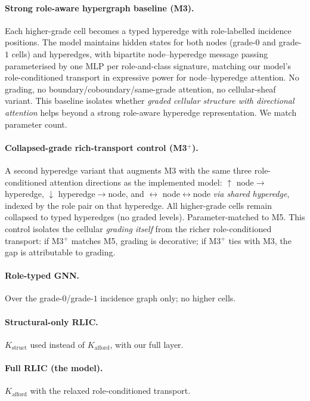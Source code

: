 \documentclass[11pt]{article}
\theoremstyle{definition}
\theoremstyle{plain}
\newcommand{\Kstruct}{K_{\mathrm{struct}}}
\newcommand{\Kafford}{K_{\mathrm{afford}}}
\begin{document}
\paragraph{Strong role-aware hypergraph baseline (M3).}
Each higher-grade cell becomes a typed hyperedge with role-labelled incidence positions. The model maintains hidden states for both nodes (grade-$0$ and grade-$1$ cells) and hyperedges, with bipartite node--hyperedge message passing parameterised by one MLP per role-and-class signature, matching our model's role-conditioned transport in expressive power for node--hyperedge attention. No grading, no boundary/coboundary/same-grade attention, no cellular-sheaf variant. This baseline isolates whether \emph{graded cellular structure with directional attention} helps beyond a strong role-aware hyperedge representation. We match parameter count.

\paragraph{Collapsed-grade rich-transport control (M3$^{+}$).}
A second hyperedge variant that augments M3 with the same three
role-conditioned attention directions as the implemented model: $\uparrow$
node$\to$hyperedge, $\downarrow$ hyperedge$\to$node, and $\leftrightarrow$
node$\leftrightarrow$node \emph{via shared hyperedge}, indexed by the role
pair on that hyperedge. All higher-grade cells remain collapsed to typed
hyperedges (no graded levels). Parameter-matched to M5. This control
isolates the cellular \emph{grading itself} from the richer
role-conditioned transport: if M3$^{+}$ matches M5, grading is decorative;
if M3$^{+}$ ties with M3, the gap is attributable to grading.

\paragraph{Role-typed GNN.}
Over the grade-$0$/grade-$1$ incidence graph only; no higher cells.

\paragraph{Structural-only RLIC.}
$\Kstruct$ used instead of $\Kafford$, with our full layer.

\paragraph{Full RLIC (the model).}
$\Kafford$ with the relaxed role-conditioned transport.
\end{document}
